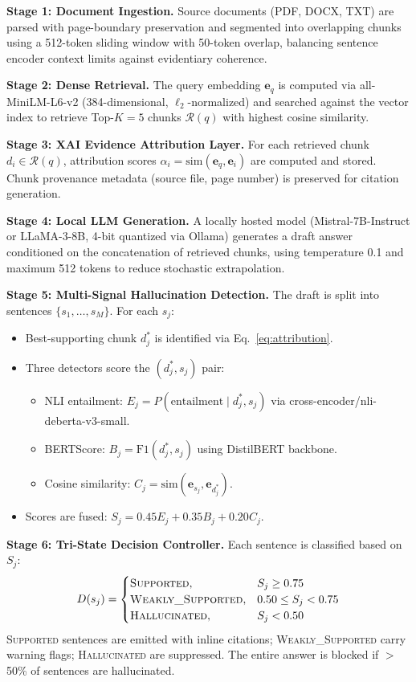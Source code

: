 \documentclass[conference]{IEEEtran}
\begin{document}
\textbf{Stage 1: Document Ingestion.} Source documents (PDF, DOCX, TXT) are parsed with page-boundary preservation and segmented into overlapping chunks using a 512-token sliding window with 50-token overlap, balancing sentence encoder context limits against evidentiary coherence.

\textbf{Stage 2: Dense Retrieval.} The query embedding $\mathbf{e}_q$ is computed via all-MiniLM-L6-v2 (384-dimensional, $\ell_2$-normalized) and searched against the vector index to retrieve Top-$K{=}5$ chunks $\mathcal{R}(q)$ with highest cosine similarity.

\textbf{Stage 3: XAI Evidence Attribution Layer.} For each retrieved chunk $d_i \in \mathcal{R}(q)$, attribution scores $\alpha_i = \mathrm{sim}(\mathbf{e}_q, \mathbf{e}_i)$ are computed and stored. Chunk provenance metadata (source file, page number) is preserved for citation generation.

\textbf{Stage 4: Local LLM Generation.} A locally hosted model (Mistral-7B-Instruct or LLaMA-3-8B, 4-bit quantized via Ollama) generates a draft answer conditioned on the concatenation of retrieved chunks, using temperature 0.1 and maximum 512 tokens to reduce stochastic extrapolation.

\textbf{Stage 5: Multi-Signal Hallucination Detection.} The draft is split into sentences $\{s_1, \ldots, s_M\}$. For each $s_j$:
\begin{itemize}
    \item Best-supporting chunk $d^*_j$ is identified via Eq.~\ref{eq:attribution}.
    \item Three detectors score the $(d^*_j, s_j)$ pair:
    \begin{itemize}
        \item NLI entailment: $E_j = P(\mathrm{entailment} \mid d^*_j, s_j)$ via cross-encoder/nli-deberta-v3-small.
        \item BERTScore: $B_j = \mathrm{F1}(d^*_j, s_j)$ using DistilBERT backbone.
        \item Cosine similarity: $C_j = \mathrm{sim}(\mathbf{e}_{s_j}, \mathbf{e}_{d^*_j})$.
    \end{itemize}
    \item Scores are fused: $S_j = 0.45 E_j + 0.35 B_j + 0.20 C_j$.
\end{itemize}

\textbf{Stage 6: Tri-State Decision Controller.} Each sentence is classified based on $S_j$:
\begin{equation}
D(s_j) =
\begin{cases}
\textsc{Supported}, & S_j \geq 0.75 \\
\textsc{Weakly\_Supported}, & 0.50 \leq S_j < 0.75 \\
\textsc{Hallucinated}, & S_j < 0.50
\end{cases}
\label{eq:tristate}
\end{equation}
\textsc{Supported} sentences are emitted with inline citations; \textsc{Weakly\_Supported} carry warning flags; \textsc{Hallucinated} are suppressed. The entire answer is blocked if $>$50\% of sentences are hallucinated.
\end{document}
